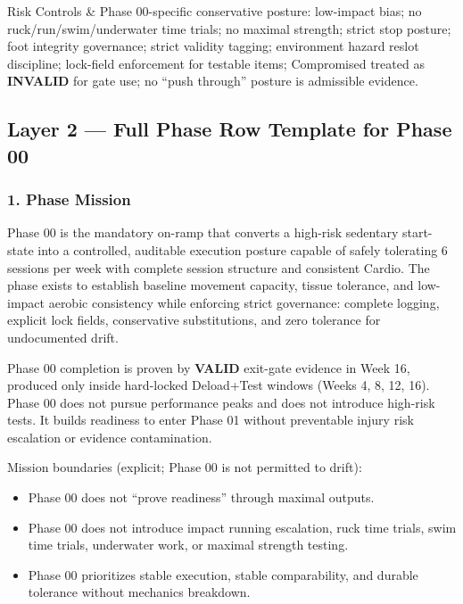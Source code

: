 \documentclass[10pt]{article}
\begin{document}
\begin{longtblr}
Risk Controls & Phase 00-specific conservative posture: low-impact bias; no ruck/run/swim/underwater time trials; no maximal strength; strict stop posture; foot integrity governance; strict validity tagging; environment hazard reslot discipline; lock-field enforcement for testable items; Compromised treated as \textbf{INVALID} for gate use; no “push through” posture is admissible evidence. \\
\end{longtblr}

\endgroup

\newpage

\subsection*{Layer 2 — Full Phase Row Template for Phase 00}
{}

\subsubsection*{1. Phase Mission}

Phase 00 is the mandatory on-ramp that converts a high-risk sedentary start-state into a controlled, auditable execution posture capable of safely tolerating 6 sessions per week with complete session structure and consistent Cardio. The phase exists to establish baseline movement capacity, tissue tolerance, and low-impact aerobic consistency while enforcing strict governance: complete logging, explicit lock fields, conservative substitutions, and zero tolerance for undocumented drift.

Phase 00 completion is proven by \textbf{VALID} exit-gate evidence in Week 16, produced only inside hard-locked Deload+Test windows (Weeks 4, 8, 12, 16). Phase 00 does not pursue performance peaks and does not introduce high-risk tests. It builds readiness to enter Phase 01 without preventable injury risk escalation or evidence contamination.

Mission boundaries (explicit; Phase 00 is not permitted to drift):

\begin{itemize}
\item Phase 00 does not “prove readiness” through maximal outputs.
\item Phase 00 does not introduce impact running escalation, ruck time trials, swim time trials, underwater work, or maximal strength testing.
\item Phase 00 prioritizes stable execution, stable comparability, and durable tolerance without mechanics breakdown.
\end{itemize}
\end{document}
